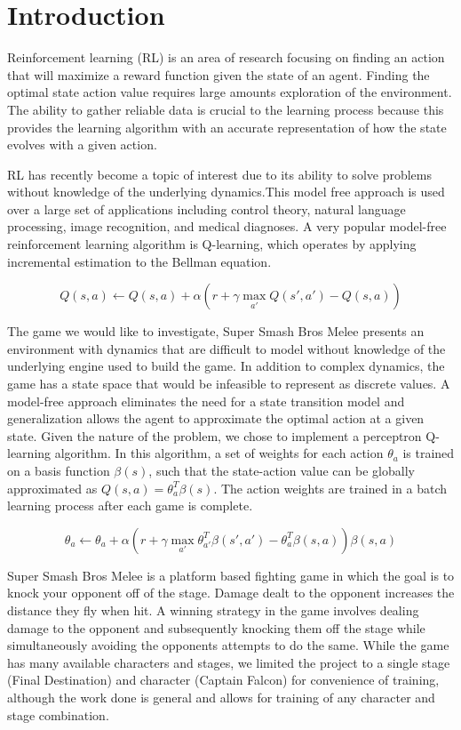 
\section{Introduction}

Reinforcement learning (RL) is an area of research focusing on finding an action that will maximize a reward function given the state of an agent. Finding the optimal state action value requires large amounts exploration of the environment. The ability to gather reliable data is crucial to the learning process because this provides the learning algorithm with an accurate representation of how the state evolves with a given action. 

RL has recently become a topic of interest due to its ability to solve problems without knowledge of the underlying dynamics.This model free approach is used over a large set of applications including control theory, natural language processing, image recognition, and medical diagnoses. A very popular model-free reinforcement learning algorithm is Q-learning, which operates by applying incremental estimation to the Bellman equation.

\begin{equation}
	Q(s,a) \leftarrow Q(s,a)+\alpha(r + \gamma \max_{a'} Q(s',a') - Q(s,a))
\end{equation}

The game we would like to investigate, Super Smash Bros Melee presents an environment with dynamics that are difficult to model without knowledge of the underlying engine used to build the game. In addition to complex dynamics, the game has a state space that would be infeasible to represent as discrete values. A model-free approach eliminates the need for a state transition model and generalization allows the agent to approximate the optimal action at a given state. Given the nature of the problem, we chose to implement a perceptron Q-learning algorithm. In this algorithm, a set of weights for each action $\theta_a$ is trained on a basis function $\beta(s)$, such that the state-action value can be globally approximated as $Q(s,a) = \theta^T_a\beta(s)$. The action weights are trained in a batch learning process after each game is complete.

\begin{equation}
	\theta_a \leftarrow \theta_a+\alpha(r + \gamma \max_{a'} \theta_{a'}^T\beta(s',a') -  \theta_{a}^T\beta(s,a))\beta(s,a)
\end{equation}

Super Smash Bros Melee is a platform based fighting game in which the goal is to knock your opponent off of the stage. Damage dealt to the opponent increases the distance they fly when hit. A winning strategy in the game involves dealing damage to the opponent and subsequently knocking them off the stage while simultaneously avoiding the opponents attempts to do the same. While the game has many available characters and stages, we limited the project to a single stage (Final Destination) and character (Captain Falcon) for convenience of training, although the work done is general and allows for training of any character and stage combination.

